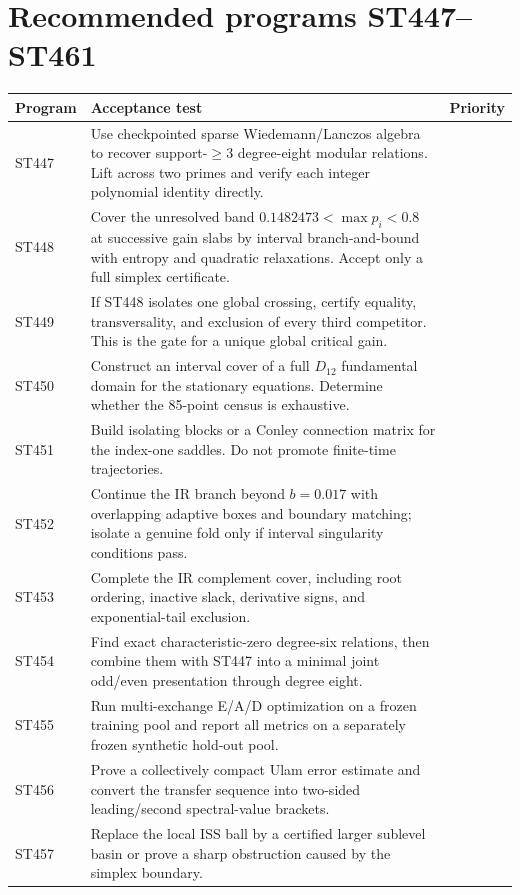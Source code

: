 \documentclass[11pt,a4paper]{article}
\begin{document}
\section{Recommended programs ST447--ST461}

\begin{longtable}{>{\raggedright\arraybackslash}p{}>{\raggedright\arraybackslash}p{}>{\raggedright\arraybackslash}p{}}
\toprule Program&Acceptance test&Priority\\\midrule\endhead
ST447&Use checkpointed sparse Wiedemann/Lanczos algebra to recover support-$\ge3$ degree-eight modular relations.  Lift across two primes and verify each integer polynomial identity directly.&1\\
ST448&Cover the unresolved band $0.1482473<\max p_i<0.8$ at successive gain slabs by interval branch-and-bound with entropy and quadratic relaxations.  Accept only a full simplex certificate.&1\\
ST449&If ST448 isolates one global crossing, certify equality, transversality, and exclusion of every third competitor.  This is the gate for a unique global critical gain.&1\\
ST450&Construct an interval cover of a full $D_{12}$ fundamental domain for the stationary equations.  Determine whether the 85-point census is exhaustive.&1\\
ST451&Build isolating blocks or a Conley connection matrix for the index-one saddles.  Do not promote finite-time trajectories.&2\\
ST452&Continue the IR branch beyond $b=0.017$ with overlapping adaptive boxes and boundary matching; isolate a genuine fold only if interval singularity conditions pass.&2\\
ST453&Complete the IR complement cover, including root ordering, inactive slack, derivative signs, and exponential-tail exclusion.&2\\
ST454&Find exact characteristic-zero degree-six relations, then combine them with ST447 into a minimal joint odd/even presentation through degree eight.&2\\
ST455&Run multi-exchange E/A/D optimization on a frozen training pool and report all metrics on a separately frozen synthetic hold-out pool.&3\\
ST456&Prove a collectively compact Ulam error estimate and convert the transfer sequence into two-sided leading/second spectral-value brackets.&2\\
ST457&Replace the local ISS ball by a certified larger sublevel basin or prove a sharp obstruction caused by the simplex boundary.&2\\

\end{longtable}
\end{document}
